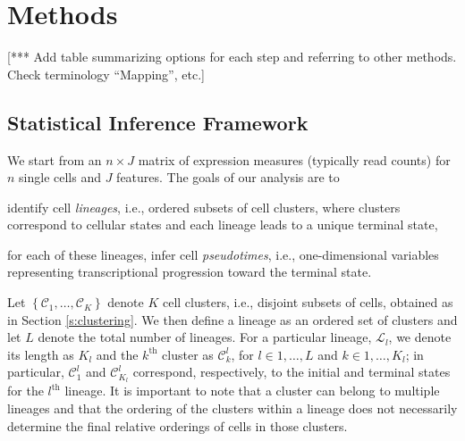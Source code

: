 \documentclass[11pt]{article}\usepackage[]{graphicx}\usepackage[]{color}
\begin{document}
\section{Methods}

[*** Add table summarizing options for each step and referring to other methods. Check terminology ``Mapping'', etc.]

 \subsection{Statistical Inference Framework}
 We start from an $n \times J$ matrix of expression measures (typically read counts) for $n$ single cells and $J$ features. The goals of our analysis are to 
 \begin{enumerate*}[font={\bfseries}]
 \item 
 identify cell {\em lineages}, i.e., ordered subsets of cell clusters, where clusters correspond to cellular states and each lineage leads to a unique terminal state,  
 \item for each of these lineages, infer cell {\em pseudotimes}, i.e., one-dimensional variables representing transcriptional progression toward the terminal state.
 \end{enumerate*}


 Let $\left\{\mathcal{C}_1,\dots,\mathcal{C}_K\right\}$ denote $K$ cell clusters, i.e., disjoint subsets of cells, obtained as in Section \ref{s:clustering}. We then define a lineage as an ordered set of clusters and let $L$ denote the total number of lineages. For a particular lineage, $\mathcal{L}_l$, we denote its length as $K_l$ and the $k^\text{th}$ cluster as $\mathcal{C}^l_k$, for $l \in 1,\dots,L$ and $k \in 1,\dots,K_l$; in particular, $\mathcal{C}^{l}_1$ and $\mathcal{C}^{l}_{K_l}$ correspond, respectively, to the initial and terminal states for the $l^\text{th}$ lineage. It is important to note that a cluster can belong to multiple lineages and that the ordering of the clusters within a lineage does not necessarily determine the final relative orderings of cells in those clusters.
 
\end{document}
